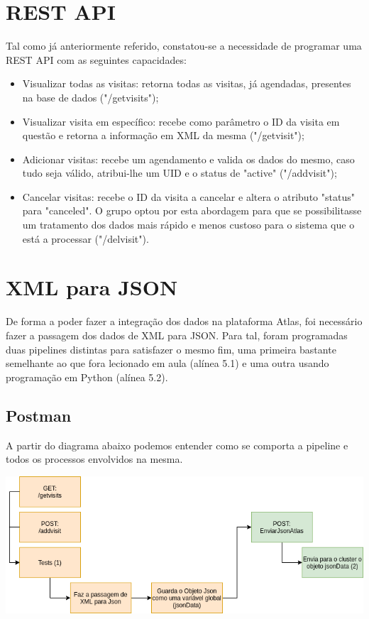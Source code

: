 \documentclass{article}
\begin{document}
\section{REST API}
Tal como já anteriormente referido, constatou-se a necessidade de programar uma REST API com as seguintes capacidades: \par
\begin{itemize} 
    \item Visualizar todas as visitas: retorna todas as visitas, já agendadas, presentes na base de dados ("/getvisits");
    \item Visualizar visita em específico: recebe como parâmetro o ID da visita em questão e retorna a informação em XML da mesma ("/getvisit");
    \item Adicionar visitas: recebe um agendamento e valida os dados do mesmo, caso tudo seja válido, atribui-lhe um UID e o status de "active" ("/addvisit");
    \item Cancelar visitas: recebe o ID da visita a cancelar e altera o atributo "status" para "canceled". O grupo optou por esta abordagem para que se  possibilitasse um tratamento dos dados mais rápido e menos custoso para o sistema que o está a processar ("/delvisit").
\end{itemize}

\section{XML para JSON}
\hspace{0.5cm} De forma a poder fazer a integração dos dados na plataforma Atlas, foi necessário fazer a passagem dos dados de XML para JSON. Para tal, foram programadas duas pipelines distintas para satisfazer o mesmo fim, uma primeira bastante semelhante ao que fora lecionado em aula (alínea 5.1) e uma outra usando programação em Python (alínea 5.2).
\subsection{Postman}

\hspace{0.5cm} A partir do diagrama abaixo podemos entender como se comporta a pipeline e todos os processos envolvidos na mesma.
\begin{center}
    \includegraphics[scale=0.57]{Images/XMLtoJsonDiagram.drawio.png}
\end{center}
\end{document}
